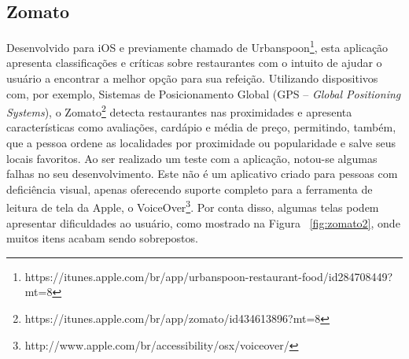\subsection{\label{subsec:zomato}Zomato}
Desenvolvido para iOS e previamente chamado de Urbanspoon\footnote{https://itunes.apple.com/br/app/urbanspoon-restaurant-food/id284708449?mt=8},  esta aplicação apresenta classificações e críticas sobre restaurantes com o intuito de ajudar o usuário a encontrar a melhor opção para sua refeição. Utilizando dispositivos com, por exemplo, Sistemas de Posicionamento Global (GPS -- \emph{Global Positioning Systems}), o Zomato\footnote{https://itunes.apple.com/br/app/zomato/id434613896?mt=8} detecta restaurantes nas proximidades e apresenta características como avaliações, cardápio e média de preço, permitindo, também, que a pessoa ordene as localidades por proximidade ou popularidade e salve seus locais favoritos. Ao ser realizado um teste com a aplicação, notou-se algumas falhas no seu desenvolvimento. Este não é um aplicativo criado para pessoas com deficiência visual, apenas oferecendo suporte completo para a ferramenta de leitura de tela da Apple, o VoiceOver\footnote{http://www.apple.com/br/accessibility/osx/voiceover/}. Por conta disso, algumas telas podem apresentar dificuldades ao usuário, como mostrado na Figura ~\ref{fig:zomato2}, onde muitos itens acabam sendo sobrepostos.

